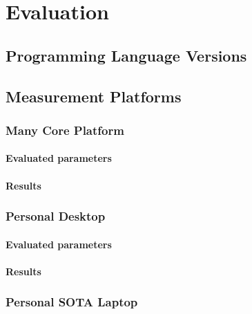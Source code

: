 \chapter{Evaluation}\label{chap:evaluation}

\section{Programming Language Versions}

\section{Measurement Platforms}
\subsection{Many Core Platform}
\subsubsection{Evaluated parameters}
\subsubsection{Results}

\subsection{Personal Desktop}
\subsubsection{Evaluated parameters}
\subsubsection{Results}

\subsection{Personal SOTA Laptop}
